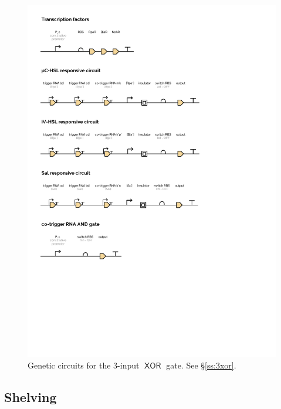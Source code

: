 \documentclass[12pt,notitlepage]{article}
\newcommand{\XOR}{\ensuremath{\mathop{\mathsf{XOR}}}\xspace}
\begin{document}
\begin{figure}
    \centering
    \includegraphics[height=(\textheight-2\baselineskip)]{xor_ribocomputing/xor_circuit_plot_2}
    \caption{Genetic circuits for the 3-input \XOR gate. See \S\ref{ss:3xor}.}
    \label{f:p_construct_xor}
\end{figure}





\subsection{Shelving}
\end{document}
